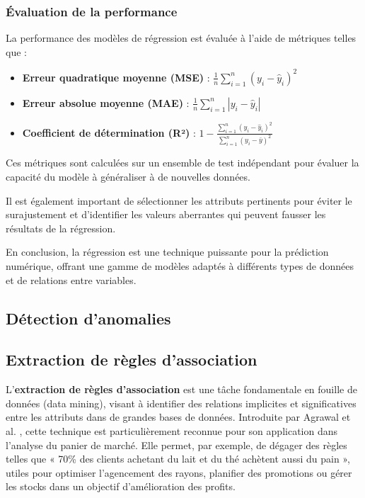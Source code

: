 \documentclass[a4paper,12pt]{report}
\begin{document}
\subsubsection*{Évaluation de la performance}

La performance des modèles de régression est évaluée à l’aide de métriques telles que :

\begin{itemize}
    \item \textbf{Erreur quadratique moyenne (MSE)} : \(\frac{1}{n} \sum_{i=1}^n (y_i - \hat{y}_i)^2\)
    \item \textbf{Erreur absolue moyenne (MAE)} : \(\frac{1}{n} \sum_{i=1}^n |y_i - \hat{y}_i|\)
    \item \textbf{Coefficient de détermination (R²)} : \(1 - \frac{\sum_{i=1}^n (y_i - \hat{y}_i)^2}{\sum_{i=1}^n (y_i - \bar{y})^2}\)
\end{itemize}

Ces métriques sont calculées sur un ensemble de test indépendant pour évaluer la capacité du modèle à généraliser à de nouvelles données.

Il est également important de sélectionner les attributs pertinents pour éviter le surajustement et d’identifier les valeurs aberrantes qui peuvent fausser les résultats de la régression.

En conclusion, la régression est une technique puissante pour la prédiction numérique, offrant une gamme de modèles adaptés à différents types de données et de relations entre variables.  
        \subsection{Détection d’anomalies}

        \subsection{Extraction de règles d’association}
        
        L'\textbf{extraction de règles d’association} est une tâche fondamentale en fouille de données (data mining), visant à identifier des relations implicites et significatives entre les attributs dans de grandes bases de données. Introduite par Agrawal et al. , cette technique est particulièrement reconnue pour son application dans l’analyse du panier de marché. Elle permet, par exemple, de dégager des règles telles que « 70\% des clients achetant du lait et du thé achètent aussi du pain », utiles pour optimiser l’agencement des rayons, planifier des promotions ou gérer les stocks dans un objectif d’amélioration des profits.
        
\end{document}
